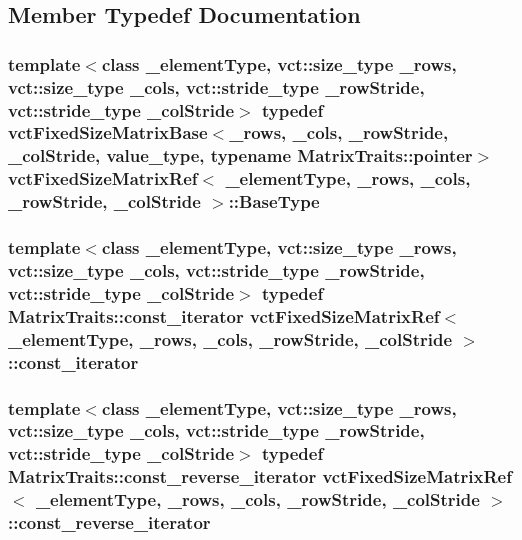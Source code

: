 \subsection{Member Typedef Documentation}
\hypertarget{classvct_fixed_size_matrix_ref_a83c7be1d6fbc75488c082cb53ebcb2ed}{
\subsubsection[{Base\-Type}]{\setlength{\rightskip}{0pt plus 5cm}template$<$class \-\_\-element\-Type, vct\-::size\-\_\-type \-\_\-rows, vct\-::size\-\_\-type \-\_\-cols, vct\-::stride\-\_\-type \-\_\-row\-Stride, vct\-::stride\-\_\-type \-\_\-col\-Stride$>$ typedef {\bf vct\-Fixed\-Size\-Matrix\-Base}$<$\-\_\-rows, \-\_\-cols, \-\_\-row\-Stride, \-\_\-col\-Stride, value\-\_\-type, typename Matrix\-Traits\-::pointer$>$ {\bf vct\-Fixed\-Size\-Matrix\-Ref}$<$ \-\_\-element\-Type, \-\_\-rows, \-\_\-cols, \-\_\-row\-Stride, \-\_\-col\-Stride $>$\-::{\bf Base\-Type}}}\label{classvct_fixed_size_matrix_ref_a83c7be1d6fbc75488c082cb53ebcb2ed}
\hypertarget{classvct_fixed_size_matrix_ref_a7c8a96934427f6a5a5c410abe5c0fccb}{
\subsubsection[{const\-\_\-iterator}]{\setlength{\rightskip}{0pt plus 5cm}template$<$class \-\_\-element\-Type, vct\-::size\-\_\-type \-\_\-rows, vct\-::size\-\_\-type \-\_\-cols, vct\-::stride\-\_\-type \-\_\-row\-Stride, vct\-::stride\-\_\-type \-\_\-col\-Stride$>$ typedef {\bf Matrix\-Traits\-::const\-\_\-iterator} {\bf vct\-Fixed\-Size\-Matrix\-Ref}$<$ \-\_\-element\-Type, \-\_\-rows, \-\_\-cols, \-\_\-row\-Stride, \-\_\-col\-Stride $>$\-::{\bf const\-\_\-iterator}}}\label{classvct_fixed_size_matrix_ref_a7c8a96934427f6a5a5c410abe5c0fccb}
\hypertarget{classvct_fixed_size_matrix_ref_acfd6ce4ca9ac345fc5ed261df8743c42}{
\subsubsection[{const\-\_\-reverse\-\_\-iterator}]{\setlength{\rightskip}{0pt plus 5cm}template$<$class \-\_\-element\-Type, vct\-::size\-\_\-type \-\_\-rows, vct\-::size\-\_\-type \-\_\-cols, vct\-::stride\-\_\-type \-\_\-row\-Stride, vct\-::stride\-\_\-type \-\_\-col\-Stride$>$ typedef {\bf Matrix\-Traits\-::const\-\_\-reverse\-\_\-iterator} {\bf vct\-Fixed\-Size\-Matrix\-Ref}$<$ \-\_\-element\-Type, \-\_\-rows, \-\_\-cols, \-\_\-row\-Stride, \-\_\-col\-Stride $>$\-::{\bf const\-\_\-reverse\-\_\-iterator}}}\label{classvct_fixed_size_matrix_ref_acfd6ce4ca9ac345fc5ed261df8743c42}
